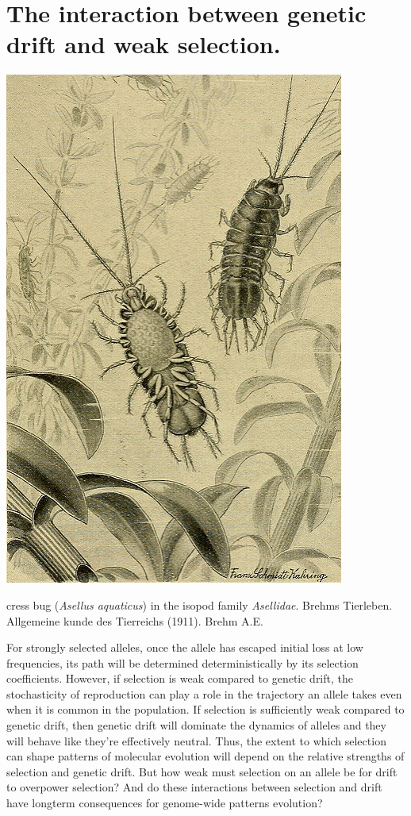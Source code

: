 {\section{The interaction between genetic drift and weak selection.}
 \begin{marginfigure}
 \begin{center}
 \includegraphics[width=0.7 \textwidth]{illustration_images/Genetic_drift_selection/Isopod_Asellidae/20406697312_1a9aa75024_z.jpg}
 \end{center}
 \caption{cress bug ({\it Asellus aquaticus}) in the isopod family
   {\it Asellidae}. Brehms Tierleben. Allgemeine kunde des Tierreichs (1911).  Brehm A.E.} \label{fig: asellid_isopod}
 \end{marginfigure}
For strongly selected alleles, once the allele has escaped initial
loss at low frequencies, its path will be determined deterministically by its
selection coefficients. However, if selection is weak compared to
genetic drift, the stochasticity of reproduction can play a role in the trajectory an
allele takes even when it is common in the population. If selection is
sufficiently weak compared to genetic drift, then genetic drift will dominate the dynamics of alleles
and they will behave like they're effectively neutral. Thus, the extent
to which selection can shape patterns of molecular evolution will
depend on the relative strengths of selection and genetic drift.
But how weak must selection on an allele be for drift to overpower
selection? And do these interactions between selection and drift have longterm consequences for genome-wide patterns evolution?

}
